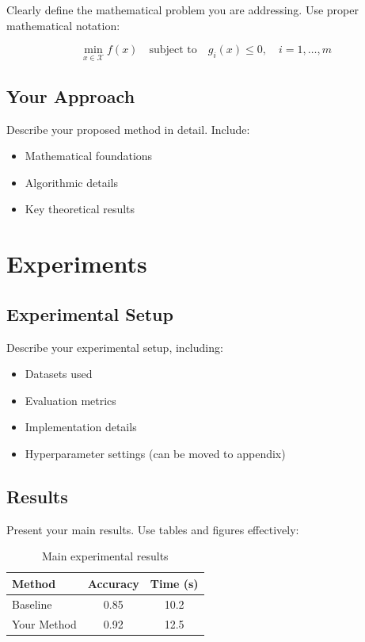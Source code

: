 \documentclass{article}
\begin{document}
Clearly define the mathematical problem you are addressing. Use proper mathematical notation:

\begin{equation}
\min_{x \in \mathcal{X}} f(x) \quad \text{subject to} \quad g_i(x) \leq 0, \quad i = 1, \ldots, m
\end{equation}

\subsection{Your Approach}

Describe your proposed method in detail. Include:

\begin{itemize}
\item Mathematical foundations
\item Algorithmic details
\item Key theoretical results
\end{itemize}

\section{Experiments}

\subsection{Experimental Setup}

Describe your experimental setup, including:
\begin{itemize}
\item Datasets used
\item Evaluation metrics
\item Implementation details
\item Hyperparameter settings (can be moved to appendix)
\end{itemize}

\subsection{Results}

Present your main results. Use tables and figures effectively:

\begin{table}[h]
  \caption{Main experimental results}
  \label{tab:results}
  \centering
  \begin{tabular}{lcc}
    \toprule
    Method & Accuracy & Time (s) \\
    \midrule
    Baseline & 0.85 & 10.2 \\
    Your Method & 0.92 & 12.5 \\
    \bottomrule
  \end{tabular}
\end{table}
\end{document}
